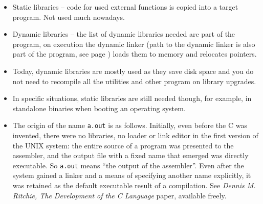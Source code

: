 \begin{itemize}
\item Static libraries -- code for used external functions is copied into a
target program.  Not used much nowadays.
\item Dynamic libraries -- the list of dynamic libraries needed are part of the
program, on execution the dynamic linker (path to the dynamic linker is also
part of the program, see page \pageref{RUNTIMELINKER}) loads them to memory and
relocates pointers.
\item Today, dynamic libraries are mostly used as they save disk space and you
do not need to recompile all the utilities and other program on library
upgrades.
\item In specific situations, static libraries are still needed though, for
example, in standalone binaries when booting an operating system.
\item The origin of the name \texttt{a.out} is as follows.  Initially, even
before the C was invented, there were no libraries, no loader or link editor in
the first version of the UNIX system: the entire source of a program was
presented to the assembler, and the output file with a fixed name that emerged
was directly executable.  So \texttt{a.out} means ``the output of the
assembler''.  Even after the system gained a linker and a means of specifying
another name explicitly, it was retained as the default executable result of a
compilation.  See \emph{Dennis M. Ritchie, The Development of the C Language}
paper, available freely.
\end{itemize}


\begin{slide}
\begin{center}

\end{center}
\end{slide}


